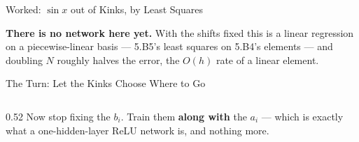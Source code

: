 \begin{frame}{Worked: $\sin x$ out of Kinks, by Least Squares}
\begin{takeawaybox}\footnotesize
\textbf{There is no network here yet.} With the shifts fixed this is a linear regression on a piecewise-linear basis --- 5.B5's least squares on 5.B4's elements --- and doubling $N$ roughly halves the error, the $O(h)$ rate of a linear element.
\end{takeawaybox}
\vspace{1mm}
\end{frame}

\begin{frame}{The Turn: Let the Kinks Choose Where to Go}
\begin{columns}[T]
\begin{column}{0.52\textwidth}
\small
Now stop fixing the $b_i$. Train them \textbf{along with} the $a_i$ --- which is exactly what a one-hidden-layer ReLU network is, and nothing more.
\medskip


\end{column}
\end{columns}
\end{frame}

